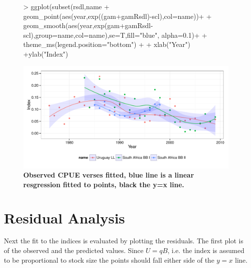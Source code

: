 \documentclass[shortnames,nojss,article]{jss}
\begin{document}
\begin{figure}\begin{center}
\begin{Schunk}
\begin{Sinput}
>     ggplot(subset(rsdl,name %
+             geom_point(aes(year,exp((gam+gamRsdl)-scl),col=name))+
+              geom_smooth(aes(year,exp(gam+gamRsdl-scl),group=name,col=name),se=T,fill="blue", alpha=0.1)+
+              theme_ms(legend.position="bottom")  +
+              xlab("Year") +ylab("Index")
\end{Sinput}
\end{Schunk}
\includegraphics{diags-012}
\caption{\bf{Observed CPUE verses fitted, blue line is a linear resgression fitted to points, black the y=x line.}}
\label{cpue:5}
\end{center}
\end{figure}

\clearpage
\section{Residual Analysis}

Next the fit to the indices is evaluated by plotting the residuals. The first plot is of the observed and the predicted values. Since $U=qB$, i.e. the index is assumed to be proportional to stock size the points should fall either side of the $y=x$ line.    
\end{document}
